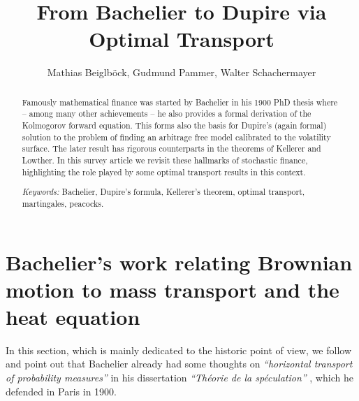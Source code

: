 \documentclass[11pt,a4paper]{article}%
\title{From Bachelier to Dupire via Optimal Transport
}
\author{Mathias Beiglb\"ock, Gudmund Pammer,
Walter Schachermayer}
\newcommand{\cpurple}{\color{purple}}
\numberwithin{equation}{section}
\begin{document}
\maketitle
\begin{abstract} 
Famously mathematical finance was started by Bachelier  in his 1900 PhD thesis where -- among many other achievements -- he also provides a formal derivation of the Kolmogorov forward equation. This forms also the basis for Dupire's (again formal) solution to the problem of finding an arbitrage free model calibrated to the volatility surface. 
 The later result has  rigorous counterparts in the theorems of Kellerer and Lowther. In this survey article we revisit these hallmarks of stochastic finance,  highlighting the role played by some optimal transport results in this context.


{\em Keywords:}  
Bachelier, Dupire's formula, Kellerer's theorem,  optimal transport, martingales, peacocks.
\end{abstract} 








\section{Bachelier's work relating Brownian motion to mass transport and the heat equation} \label{ahnbwrbmtthe}




In this section, which is mainly dedicated to the historic point of view,  {we follow \cite{Sc03}} and point out that Bachelier already had some thoughts on \textit{``horizontal transport of probability measures''} in his dissertation \textit{``Th{\'e}orie de la sp{\'e}culation''} \cite{Ba00}, which he defended in Paris in 1900.
\end{document}

